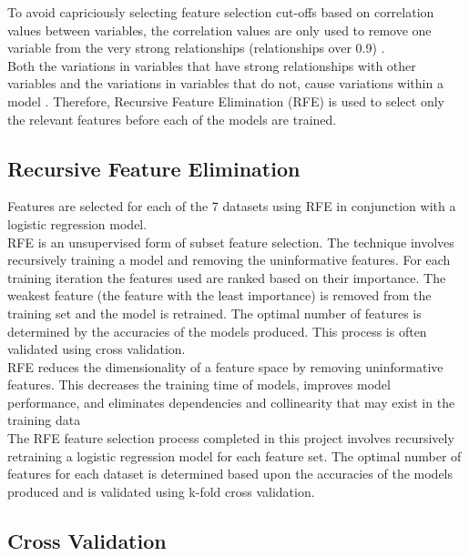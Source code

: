 \vspace{10 pt}

To avoid capriciously selecting feature selection cut-offs based on correlation values between variables, the correlation values are only used to remove one variable from the very strong relationships (relationships over 0.9) \parencite{correlation1}. \\

Both the variations in variables that have strong relationships with other variables and the variations in variables that do not, cause variations within a model \parencite{correlation2}. Therefore, Recursive Feature Elimination (RFE) is used to select only the relevant features before each of the models are trained. 


\subsection{Recursive Feature Elimination}

Features are selected for each of the 7 datasets using RFE in conjunction with a logistic regression model. \\

RFE is an unsupervised form of subset feature selection. The technique involves recursively training a model and removing the uninformative features. For each training iteration the features used are ranked based on their importance. The weakest feature (the feature with the least importance) is removed from the training set and the model is retrained. The optimal number of features is determined by the accuracies of the models produced. This process is often validated using cross validation.  \parencite{RFE} \\

RFE reduces the dimensionality of a feature space by removing uninformative features. This decreases the training time of models, improves model performance, and eliminates dependencies and collinearity that may exist in the training data \parencite{RFE} \\

The RFE feature selection process completed in this project involves recursively retraining a logistic regression model for each feature set. The optimal number of features for each dataset is determined based upon the accuracies of the models produced and is validated using k-fold cross validation. 

\subsection{Cross Validation}

